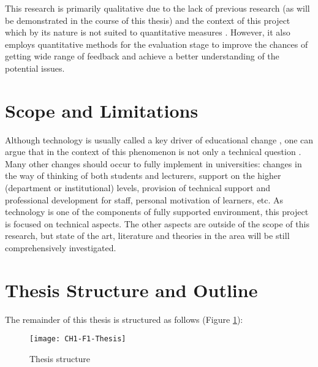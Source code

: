 This research is primarily qualitative due to the lack of previous research (as
will be demonstrated in the course of this thesis) and the \LLLs context of this
project which by its nature is not suited to quantitative measures
\citep{Creswell2009}. However, it also employs quantitative methods for the 
evaluation stage to improve the chances of getting wide range of feedback and
achieve a better understanding of the potential issues.

\section{Scope and Limitations}

Although technology is usually called a key driver of educational change
\citep{Attwell2007}, one can argue that in the context of \LLLs this phenomenon
is not only a technical question \citep{Schaffert2008}. Many other changes
should occur to fully implement \LLLs in universities: changes in the way of
thinking of both students and lecturers, support on the higher (department or
institutional) levels, provision of technical support and professional
development for staff, personal motivation of learners, etc. As technology is
one of the components of fully supported \LLLs environment, this project is
focused on technical aspects. The other aspects are outside of the scope of
this research, but state of the art, literature and theories in the area will be
still comprehensively investigated.

\section{Thesis Structure and Outline}

The remainder of this thesis is structured as follows (Figure \ref{fig:ts}):

\begin{figure}[htb]
\centering
\texttt{[image: CH1-F1-Thesis]}
\caption{Thesis structure}
\label{fig:ts}
\end{figure}

